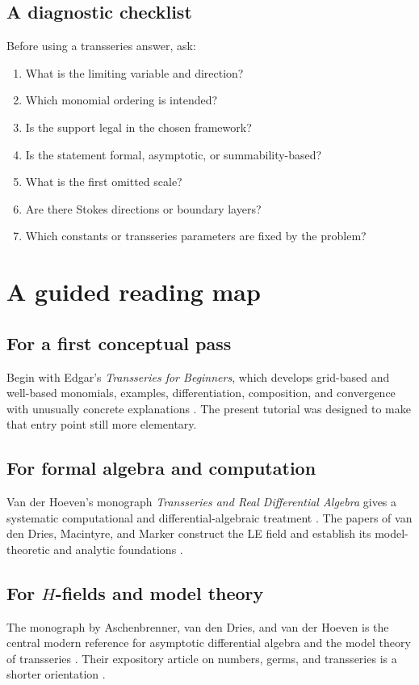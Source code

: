 \documentclass[11pt,openany]{book}
\theoremstyle{plain}
\theoremstyle{definition}
\theoremstyle{remark}
\begin{document}
\section{A diagnostic checklist}
Before using a transseries answer, ask:
\begin{enumerate}
\item What is the limiting variable and direction?
\item Which monomial ordering is intended?
\item Is the support legal in the chosen framework?
\item Is the statement formal, asymptotic, or summability-based?
\item What is the first omitted scale?
\item Are there Stokes directions or boundary layers?
\item Which constants or transseries parameters are fixed by the problem?
\end{enumerate}

\chapter{A guided reading map}
\label{chap:reading}

\section{For a first conceptual pass}
Begin with Edgar's \emph{Transseries for Beginners}, which develops grid-based and well-based monomials, examples, differentiation, composition, and convergence with unusually concrete explanations \cite{Edgar2009}. The present tutorial was designed to make that entry point still more elementary.

\section{For formal algebra and computation}
Van der Hoeven's monograph \emph{Transseries and Real Differential Algebra} gives a systematic computational and differential-algebraic treatment \cite{Hoeven2006}. The papers of van den Dries, Macintyre, and Marker construct the LE field and establish its model-theoretic and analytic foundations \cite{DMM1997,DMM2001}.

\section{\texorpdfstring{For $H$-fields and model theory}{For H-fields and model theory}}
The monograph by Aschenbrenner, van den Dries, and van der Hoeven is the central modern reference for asymptotic differential algebra and the model theory of transseries \cite{ADH2017}. Their expository article on numbers, germs, and transseries is a shorter orientation \cite{ADH2018}.
\end{document}
